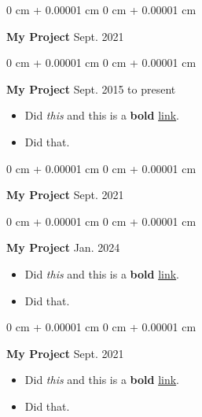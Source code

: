 \documentclass[10pt, letterpaper]{article}
\newenvironment{highlights}{
    \begin{itemize}[
        topsep=0.10 cm,
        parsep=0.10 cm,
        partopsep=0pt,
        itemsep=0pt,
        leftmargin=0 cm + 10pt
    ]
}{
    \end{itemize}
        
    \vspace{-0.20cm}
} %
\newenvironment{onecolentry}{
    \begin{adjustwidth}{
        0 cm + 0.00001 cm
    }{
        0 cm + 0.00001 cm
    }
}{
    \end{adjustwidth}
} %
\begin{document}
        \vspace{0.1 cm}

        \begin{onecolentry}
            \textbf{My Project} \hfill Sept. 2021
        \end{onecolentry}

        \vspace{0.1 cm}

        \begin{onecolentry}
            \textbf{My Project} \hfill Sept. 2015 to present
            \begin{highlights}
                \item Did \textit{this} and this is a \textbf{bold} \href{https://example.com}{link}.
                \item Did that.
            \end{highlights}
        \end{onecolentry}

        \vspace{0.1 cm}

        \begin{onecolentry}
            \textbf{My Project} \hfill Sept. 2021
        \end{onecolentry}

        \vspace{0.1 cm}

        \begin{onecolentry}
            \textbf{My Project} \hfill Jan. 2024
            \begin{highlights}
                \item Did \textit{this} and this is a \textbf{bold} \href{https://example.com}{link}.
                \item Did that.
            \end{highlights}
        \end{onecolentry}

        \vspace{0.1 cm}

        \begin{onecolentry}
            \textbf{My Project} \hfill Sept. 2021
            \begin{highlights}
                \item Did \textit{this} and this is a \textbf{bold} \href{https://example.com}{link}.
                \item Did that.
            \end{highlights}
        \end{onecolentry}
\end{document}
